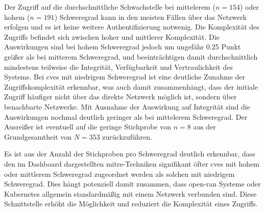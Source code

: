 \par Der Zugriff auf die durchschnittliche Schwachstelle bei mittelerem (\(n = 154\)) oder hohem (\(n = 191\)) Schweregrad kann in den meisten Fällen über das Netzwerk erfolgen und es ist keine weitere Authentifizierung notwenig. Die Komplexität des Zugriffs befindet sich zwischen hoher und mittlerer Komplexität. Die Auswirkungen sind bei hohem Schweregrad jedoch um ungefähr 0.25 Punkt größer als bei mitterem Schweregrad, und beeinträchtigen damit durchschnittlich mindestens teilweise die Integrität, Verfügbarkeit und Vertraulichkeit des Systems. Bei \glspl{cve} mit niedrigem Schweregrad ist eine deutliche Zunahme der Zugriffskomplexität erkennbar, was auch damit zusammenhängt, dass der initiale Zugriff häufiger nicht über das direkte Netzwerk möglich ist, sondern über benachbarte Netzwerke. Mit Ausnahme der Auswirkung auf Integrität sind die Auswirkungen nochmal deutlich geringer als bei mittelerem Schweregrad. Der Ausreißer ist eventuell auf die geringe Stichprobe von \(n = 8\) aus der Grundgesamtheit von \(N = 353\) zurückzuführen.

\par Es ist aus der Anzahl der Stichproben pro Schweregrad deutlich erkennbar, dass den im Dashboard dargestellten \gls{mitre}-Techniken signifikant öfter \glspl{cve} mit hohem oder mittlerem Schweregrad zugeordnet werden als solchen mit niedrigem Schweregrad. Dies hängt potenziell damit zusammen, dass \gls{open-ran} Systeme oder Kubernetes allgemein standardmäßig mit einem Netzwerk verbunden sind. Diese Schnittstelle erhöht die Möglichkeit und reduziert die Komplexität eines Zugriffs. 

